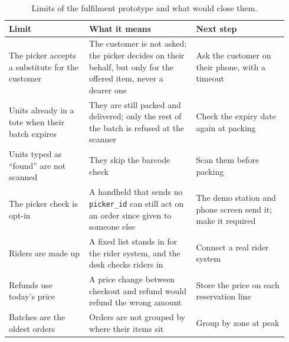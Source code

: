 \begin{table}[!htb]
  \centering
  \footnotesize
  \begin{tabular}{@{}>{\raggedright\arraybackslash}p{0.27\linewidth}>{\raggedright\arraybackslash}p{0.36\linewidth}
                  >{\raggedright\arraybackslash}p{0.31\linewidth}@{}}
    \toprule
    Limit & What it means & Next step \\
    \midrule
    The picker accepts a substitute for the customer
      & The customer is not asked; the picker decides on their behalf, but only for the offered item, never a dearer one
      & Ask the customer on their phone, with a timeout \\
    \addlinespace[3pt]
    Units already in a tote when their batch expires
      & They are still packed and delivered; only the rest of the batch is refused at the scanner
      & Check the expiry date again at packing \\
    \addlinespace[3pt]
    Units typed as ``found'' are not scanned
      & They skip the barcode check
      & Scan them before packing \\
    \addlinespace[3pt]
    The picker check is opt-in
      & A handheld that sends no \texttt{picker\_id} can still act on an order since given to someone else
      & The demo station and phone screen send it; make it required \\
    \addlinespace[3pt]
    Riders are made up
      & A fixed list stands in for the rider system, and the desk checks riders in
      & Connect a real rider system \\
    \addlinespace[3pt]
    Refunds use today's price
      & A price change between checkout and refund would refund the wrong amount
      & Store the price on each reservation line \\
    \addlinespace[3pt]
    Batches are the oldest orders
      & Orders are not grouped by where their items sit
      & Group by zone at peak \\
    \bottomrule
  \end{tabular}
  \caption{Limits of the fulfilment prototype and what would close them.}
  \label{tab:limits}
\end{table}
